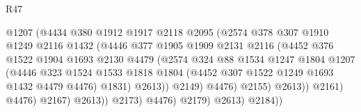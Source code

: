 \begin{lexlean}{R47}
\begin{coremodule}
                                    @1207
                                    (@4434
                                      @380
                                      @1912
                                      @1917
                                      @2118
                                      @2095
                                      (@2574
                                        @378
                                        @307
                                        @1910
                                        @1249
                                        @2116
                                        @1432
                                        (@4446
                                          @377
                                          @1905
                                          @1909
                                          @2131
                                          @2116
                                          (@4452
                                            @376
                                            @1522
                                            @1904
                                            @1693
                                            @2130
                                            @4479
                                            (@2574
                                              @324
                                              @88
                                              @1534
                                              @1247
                                              @1804
                                              @1207
                                              (@4446
                                                @323
                                                @1524
                                                @1533
                                                @1818
                                                @1804
                                                (@4452 @307 @1522 @1249 @1693 @1432 @4479 @4476)
                                                @1831)
                                              @2613))
                                          @2149)
                                        @4476)
                                      @2155)
                                    @2613))
                                @2161)
                              @4476)
                            @2167)
                          @2613))
                      @2173)
                    @4476)
                  @2179)
                @2613)
              @2184))

\end{coremodule}
\end{lexlean}
